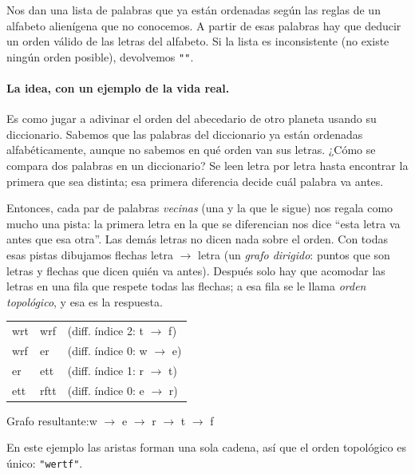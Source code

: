 
Nos dan una lista de palabras que ya están ordenadas según las reglas de un
alfabeto alienígena que no conocemos. A partir de esas palabras hay que
deducir un orden válido de las letras del alfabeto. Si la lista es
inconsistente (no existe ningún orden posible), devolvemos \texttt{""}.

\paragraph{La idea, con un ejemplo de la vida real.} Es como jugar a adivinar
el orden del abecedario de otro planeta usando su diccionario. Sabemos que las
palabras del diccionario ya están ordenadas alfabéticamente, aunque no sabemos
en qué orden van sus letras. ¿Cómo se compara dos palabras en un diccionario?
Se leen letra por letra hasta encontrar la primera que sea distinta; esa
primera diferencia decide cuál palabra va antes.

Entonces, cada par de palabras \emph{vecinas} (una y la que le sigue) nos regala
como mucho una pista: la primera letra en la que se diferencian nos dice ``esta
letra va antes que esa otra''. Las demás letras no dicen nada sobre el orden.
Con todas esas pistas dibujamos flechas letra $\to$ letra (un \emph{grafo
dirigido}: puntos que son letras y flechas que dicen quién va antes). Después
solo hay que acomodar las letras en una fila que respete todas las flechas; a
esa fila se le llama \emph{orden topológico}, y esa es la respuesta.

\begin{center}
\ttfamily
\begin{tabular}{lll}
wrt & wrf & \small (diff. índice 2: t $\to$ f)\\
wrf & er & \small (diff. índice 0: w $\to$ e)\\
er & ett & \small (diff. índice 1: r $\to$ t)\\
ett & rftt & \small (diff. índice 0: e $\to$ r)\\
\end{tabular}

\medskip
Grafo resultante:\quad w $\to$ e $\to$ r $\to$ t $\to$ f
\end{center}

\noindent En este ejemplo las aristas forman una sola cadena, así que el
orden topológico es único: \texttt{"wertf"}.

